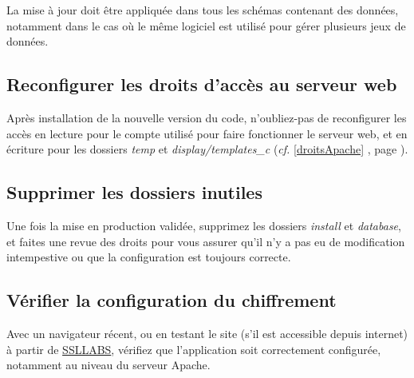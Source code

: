 La mise à jour doit être appliquée dans tous les schémas contenant des données, notamment dans le cas où le même logiciel est utilisé pour gérer plusieurs jeux de données.

\subsection{Reconfigurer les droits d'accès au serveur web}

Après installation de la nouvelle version du code, n'oubliez-pas de reconfigurer les accès en lecture pour le compte utilisé pour faire fonctionner le serveur web, et en écriture pour les dossiers \textit{temp} et \textit{display/templates\_c} (\textit{cf.} \ref{droitsApache} \textit{}, page \pageref{droitsApache}).

\subsection{Supprimer les dossiers inutiles}
Une fois la mise en production validée, supprimez les dossiers \textit{install} et \textit{database}, et faites une revue des droits pour vous assurer qu'il n'y a pas eu de modification intempestive ou que la configuration est toujours correcte.

\subsection{Vérifier la configuration du chiffrement}
Avec un navigateur récent, ou en testant le site (s'il est accessible depuis internet) à partir de \href{https://www.ssllabs.com/ssltest/}{SSLLABS}, vérifiez que l'application soit correctement configurée, notamment au niveau du serveur Apache.